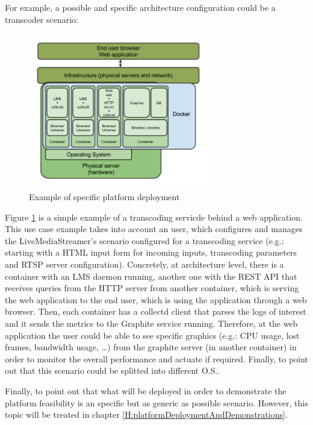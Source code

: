 For example, a possible and specific architecture configuration could be a transcoder scenario:

\begin{figure}[!htb]
\begin{center}
\includegraphics[width=0.7\textwidth]{./images/exampleArch.png}
\caption{Example of specific platform deployment}
\label{F:exampleArch}
\end{center}
\end{figure}

Figure \ref{F:exampleArch} is a simple example of a transcoding servicde behind a web application. This use case example takes into account an user, which configures and manages the LiveMediaStreamer's scenario configured for a transcoding service (e.g.: starting with a HTML input form for incoming inputs, transcoding parameters and RTSP server configuration). Concretely, at architecture level, there is a container with an LMS daemon running, another one with the REST API that receives queries from the HTTP server from another container, which is serving the web application to the end user, which is using the application through a web browser. Then, each container has a collectd client that parses the logs of interest and it sends the metrics to the Graphite service running. Therefore, at the web application the user could be able to see specific graphics (e.g.: CPU usage, lost frames, bandwidth usage, \ldots) from the graphite server (in another container) in order to monitor the overall performance and actuate if required. Finally, to point out that this scenario could be splitted into different O.S.. 

Finally, to point out that what will be deployed in order to demonstrate the platform feasibility is an specific but as generic as possible scenario. However, this topic will be treated in chapter \ref{H:platformDeploymentAndDemonstrations}.


